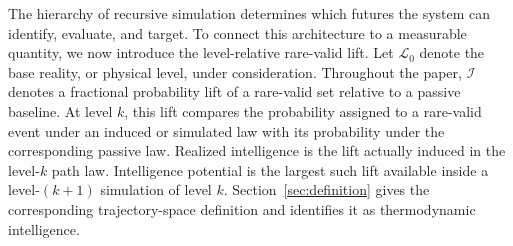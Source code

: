 \documentclass[
  aps,
  prresearch,
  reprint,
  amsmath,
  amssymb,
  superscriptaddress,
  nofootinbib,
  longbibliography
]{revtex4-2}
\newcommand{\calI}{\mathcal{I}}
\begin{document}
The hierarchy of recursive simulation determines which futures the system can identify, evaluate, and target. To connect this architecture to a measurable quantity, we now introduce the level-relative rare-valid lift. Let \(\mathcal L_0\) denote the base reality, or physical level, under consideration. Throughout the paper, \(\calI\) denotes a fractional probability lift of a rare-valid set relative to a passive baseline. At level \(k\), this lift compares the probability assigned to a rare-valid event under an induced or simulated law with its probability under the corresponding passive law. Realized intelligence is the lift actually induced in the level-\(k\) path law. Intelligence potential is the largest such lift available inside a level-\((k+1)\) simulation of level \(k\). Section~\ref{sec:definition} gives the corresponding trajectory-space definition and identifies it as thermodynamic intelligence.
\end{document}
